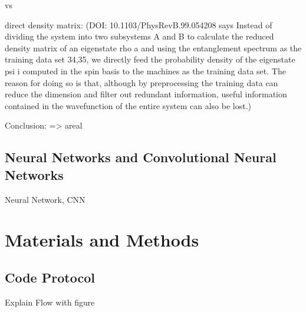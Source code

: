 \documentclass[reprint,amsmath,amssymb,aps,prb]{revtex4-2}
\begin{document}
vs

direct density matrix:
(DOI: 10.1103/PhysRevB.99.054208 says 
Instead of dividing the system into two subsystems A
and B to calculate the reduced density matrix of an eigenstate rho a and using the entanglement spectrum as the training data set 34,35, we directly feed the
probability density of the eigenstate psi i computed in the
spin basis to the machines as the training data set. The
reason for doing so is that, although by preprocessing
the training data can reduce the dimension and filter out
redundant information, useful information contained in
the wavefunction of the entire system can also be lost.)

Conclusion: => areal

\subsection{Neural Networks and Convolutional Neural Networks}

Neural Network, CNN





\section{Materials and Methods}%

\subsection{Code Protocol}

Explain Flow with figure
\end{document}

